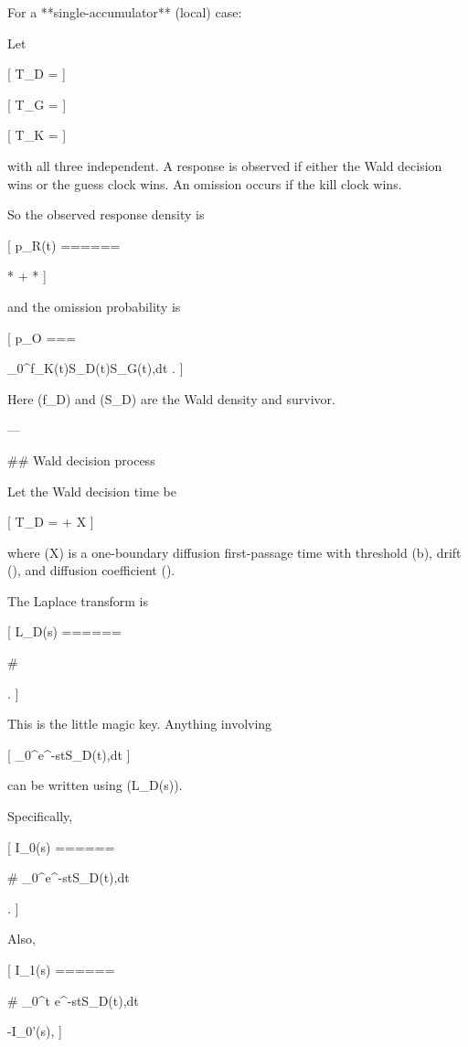 For a **single-accumulator** (local) case:

Let

[
T_D = 
]

[
T_G = 
]

[
T_K = 
]

with all three independent. A response is observed if either the Wald decision wins or the guess clock wins. An omission occurs if the kill clock wins.

So the observed response density is

[
p_R(t)
======

*{}
+
*{}
]

and the omission probability is

[
p_O
===

\int_0^\infty f_K(t)S_D(t)S_G(t),dt .
]

Here (f_D) and (S_D) are the Wald density and survivor.

---

## Wald decision process

Let the Wald decision time be

[
T_D = \tau + X
]

where (X) is a one-boundary diffusion first-passage time with threshold (b), drift (\nu), and diffusion coefficient (\sigma).

The Laplace transform is

[
L_D(s)
======

# \left[e^{-sT_D}\right]

\exp{}.
]

This is the little magic key. Anything involving

[
\int_0^\infty e^{-st}S_D(t),dt
]

can be written using (L_D(s)).

Specifically,

[
I_0(s)
======

# \int_0^\infty e^{-st}S_D(t),dt

.
]

Also,

[
I_1(s)
======

# \int_0^\infty t e^{-st}S_D(t),dt

-I_0'(s),
]


